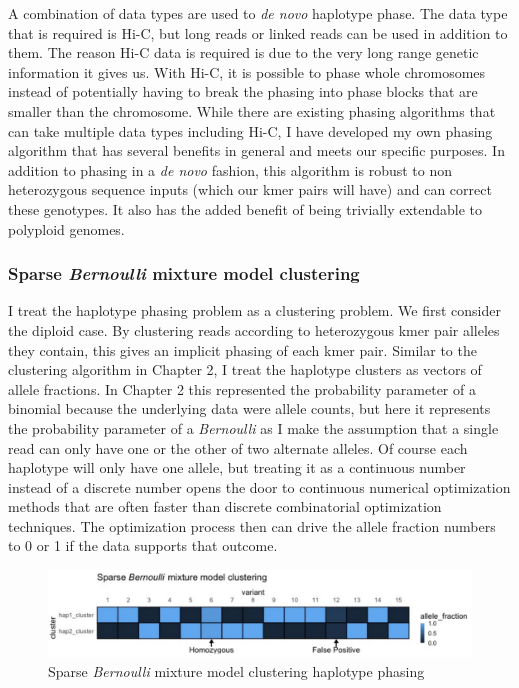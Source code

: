 \par{
A combination of data types are used to \textit{de novo} haplotype phase. The data type that is required is Hi-C, but long reads or linked reads can be used in addition to them. The reason Hi-C data is required is due to the very long range genetic information it gives us. With Hi-C, it is possible to phase whole chromosomes instead of potentially having to break the phasing into phase blocks that are smaller than the chromosome. While there are existing phasing algorithms that can take multiple data types including Hi-C\cite{hapcut2}\cite{HICphasing}, I have developed my own phasing algorithm that has several benefits in general and meets our specific purposes. In addition to phasing in a \textit{de novo} fashion, this algorithm is robust to non heterozygous sequence inputs (which our kmer pairs will have) and can correct these genotypes. It also has the added benefit of being trivially extendable to polyploid genomes.
}

\subsubsection{Sparse \textit{Bernoulli} mixture model clustering}

\par{
I treat the haplotype phasing problem as a clustering problem. We first consider the diploid case. By clustering reads according to heterozygous kmer pair alleles they contain, this gives an implicit phasing of each kmer pair. Similar to the clustering algorithm in Chapter 2, I treat the haplotype clusters as vectors of allele fractions. In Chapter 2 this represented the probability parameter of a binomial because the underlying data were allele counts, but here it represents the probability parameter of a \textit{Bernoulli} as I make the assumption that a single read can only have one or the other of two alternate alleles. Of course each haplotype will only have one allele, but treating it as a continuous number instead of a discrete number opens the door to continuous numerical optimization methods that are often faster than discrete combinatorial optimization techniques. The optimization process then can drive the allele fraction numbers to 0 or 1 if the data supports that outcome. \\
} 

\begin{figure}[htbp!]
\caption{Sparse \textit{Bernoulli} mixture model clustering haplotype phasing}
\label{figure:scaff}
\begin{centering}
\includegraphics[width=\textwidth]{sparsebernoulli.png}
\end{centering}
\end{figure}

